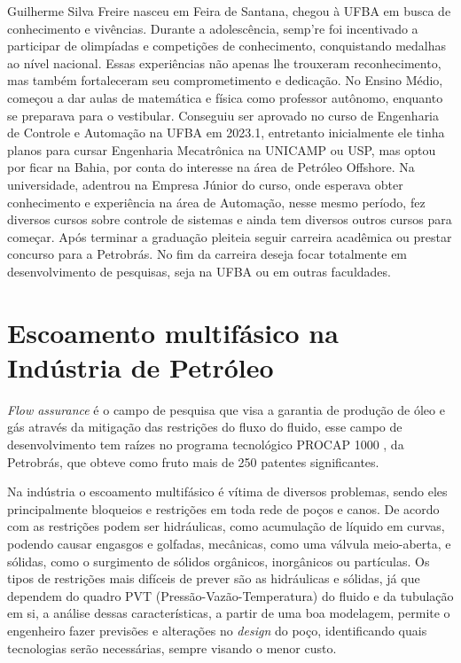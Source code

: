 \documentclass{article}[12pt, openright, oneside, a4paper, portuguese]
\begin{document}
    Guilherme Silva Freire nasceu em Feira de Santana, chegou à UFBA em busca de conhecimento e vivências. Durante a adolescência, semp're foi incentivado a participar de olimpíadas e competições de conhecimento, conquistando medalhas ao nível nacional. Essas experiências não apenas lhe trouxeram reconhecimento, mas também fortaleceram seu comprometimento e dedicação. 
    No Ensino Médio, começou a dar aulas de matemática e física como professor autônomo, enquanto se preparava para o vestibular. Conseguiu ser aprovado no curso de Engenharia de Controle e Automação na UFBA em 2023.1, entretanto inicialmente ele tinha planos para cursar Engenharia Mecatrônica na UNICAMP ou USP, mas optou por ficar na Bahia, por conta do interesse na área de Petróleo Offshore. Na universidade, adentrou na Empresa Júnior do curso, onde esperava obter conhecimento e experiência na área de Automação, nesse mesmo período, fez diversos cursos sobre controle de sistemas e ainda tem diversos outros cursos para começar.
    Após terminar a graduação pleiteia seguir carreira acadêmica ou prestar concurso para a Petrobrás. No fim da carreira deseja focar totalmente em desenvolvimento de pesquisas, seja na UFBA ou em outras faculdades.

\section{Escoamento multifásico na Indústria de Petróleo}

    \textit{Flow assurance} é o campo de pesquisa que visa a garantia de produção de óleo e gás através da mitigação das restrições do fluxo do fluido, esse campo de desenvolvimento tem raízes no programa tecnológico PROCAP 1000 \cite{Freitas1999}, da Petrobrás, que obteve como fruto mais de 250 patentes significantes.
    
    Na indústria o escoamento multifásico é vítima de diversos problemas, sendo eles principalmente bloqueios e restrições em toda rede de poços e canos. De acordo com  as restrições podem ser hidráulicas, como acumulação de líquido em curvas, podendo causar engasgos e golfadas, mecânicas, como uma válvula meio-aberta, e sólidas, como o surgimento de sólidos orgânicos, inorgânicos ou partículas. Os tipos de restrições mais difíceis de prever são as hidráulicas e sólidas, já que dependem do quadro PVT (Pressão-Vazão-Temperatura) do fluido e da tubulação em si, a análise dessas características, a partir de uma boa modelagem, permite o engenheiro fazer previsões e alterações no \textit{design} do poço, identificando quais tecnologias serão necessárias, sempre visando o menor custo.
\end{document}

